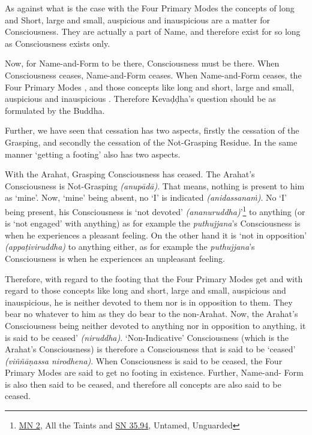 As against what is the case with the Four Primary Modes the concepts of long and Short, large and small, auspicious and inauspicious are  a matter for Consciousness. They are actually a part of Name, and therefore exist for so long as Consciousness exists only.

Now, for Name-and-Form to be there, Consciousness must be there. When Consciousness ceases, Name-and-Form ceases. When Name-and-Form ceases, the Four Primary Modes , and those concepts like long and short, large and small, auspicious and inauspicious . Therefore Kevaḍḍha's question should be as formulated by the Buddha.

Further, we have seen that cessation has two aspects, firstly the cessation of the Grasping, and secondly the cessation of the Not-Grasping Residue. In the same manner `getting a footing' also has two aspects.

With the Arahat, Grasping Consciousness has ceased. The Arahat's Consciousness is Not-Grasping \emph{(anupādā)}. That means, nothing is present to him as `mine'. Now, `mine' being absent, no `I' is indicated \emph{(anidassanaṁ)}. No `I' being present, his Consciousness is `not devoted' \emph{(ananuruddha)}'\footnote{\href{https://suttacentral.net/mn2/en/bodhi}{MN 2}, All the Taints and \href{https://suttacentral.net/sn35.94/en/bodhi}{SN 35.94}, Untamed, Unguarded} to anything (or is `not engaged' with anything) as for example the \emph{puthujjana}'s Consciousness is when he experiences a pleasant feeling. On the other hand it is `not in opposition' \emph{(appaṭiviruddha)} to anything either, as for example the \emph{puthujjana}'s Consciousness is when he experiences an unpleasant feeling.

Therefore, with regard to the footing that the Four Primary Modes get and with regard to those concepts like long and short, large and small, auspicious and inauspicious, he is neither devoted to them nor is in opposition to them. They bear no  whatever to him as they do bear to the non-Arahat. Now, the Arahat's Consciousness being neither devoted to anything nor in opposition to anything, it is said to be ceased' \emph{(niruddha)}. `Non-Indicative' Consciousness (which is the Arahat's Consciousness) is therefore a Consciousness that is said to be `ceased' \emph{(viññāṇassa nirodhena)}. When Consciousness is said to be ceased, the Four Primary Modes are said to get no footing in existence. Further, Name-and- Form is also then said to be ceased, and therefore all concepts are also said to be ceased.

